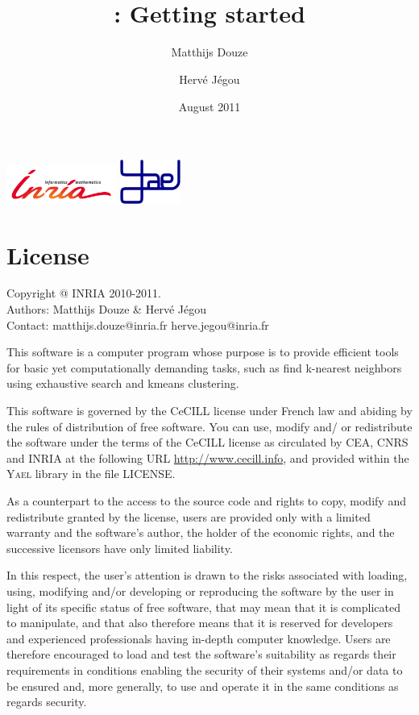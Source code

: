 \documentclass[a4paper,11pt,notitlepage,final,twoside]{report}
\title{~\vspace{9cm} \\ \yael: Getting started}
\author{Matthijs Douze \and Herv\'e J\'egou}
\date{August 2011}
\newcommand{\yael}{\textsc{Yael}\xspace}
\begin{document}
\maketitle
\thispagestyle{empty}

\vfill

\includegraphics[width=3.6cm]{./figs/logoinria} \hfill \includegraphics[width=2cm]{./figs/logoyael} 


\newpage

\chapter*{License}

\thispagestyle{empty}

Copyright @ INRIA 2010-2011. \\
Authors: Matthijs Douze \& Herv\'e J\'egou \\
Contact: matthijs.douze@inria.fr  herve.jegou@inria.fr \\
\medskip

This software is a computer program whose purpose is to provide 
efficient tools for basic yet computationally demanding tasks, 
such as find k-nearest neighbors using exhaustive search 
and kmeans clustering. 
\medskip

This software is governed by the CeCILL license under French law and
abiding by the rules of distribution of free software.  You can  use, 
modify and/ or redistribute the software under the terms of the CeCILL
license as circulated by CEA, CNRS and INRIA at the following URL
\url{http://www.cecill.info}, and provided within the \yael library 
in the file LICENSE. 
\medskip

As a counterpart to the access to the source code and  rights to copy,
modify and redistribute granted by the license, users are provided only
with a limited warranty  and the software's author,  the holder of the
economic rights,  and the successive licensors  have only  limited
liability. 
\medskip

In this respect, the user's attention is drawn to the risks associated
with loading,  using,  modifying and/or developing or reproducing the
software by the user in light of its specific status of free software,
that may mean  that it is complicated to manipulate,  and  that  also
therefore means  that it is reserved for developers  and  experienced
professionals having in-depth computer knowledge. Users are therefore
encouraged to load and test the software's suitability as regards their
requirements in conditions enabling the security of their systems and/or 
data to be ensured and,  more generally, to use and operate it in the 
same conditions as regards security. 
\medskip
\end{document}
